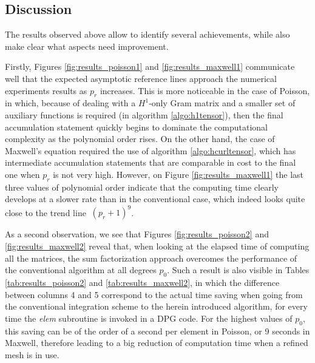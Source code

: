 \subsection{Discussion}

The results observed above allow to identify several achievements, while also make clear what aspects need improvement. 

Firstly, Figures \ref{fig:results_poisson1} and \ref{fig:results_maxwell1} communicate well that the expected asymptotic reference lines approach the numerical experiments results as $p_r$ increases. This is more noticeable in the case of Poisson, in which, because of dealing with a $H^1$-only Gram matrix and a smaller set of auxiliary functions is required (in algorithm \ref{algo:h1tensor}), then the final accumulation statement quickly begins to dominate the computational complexity as the polynomial order rises. On the other hand, the case of Maxwell's equation required the use of algorithm \ref{algo:hcurltensor}, which has intermediate accumulation statements that are comparable in cost to the final one when $p_r$ is not very high. However, on Figure \ref{fig:results_maxwell1} the last three values of polynomial order indicate that the computing time clearly develops at a slower rate than in the conventional case, which indeed looks quite close to the trend line $~(p_r+1)^9$.

As a second observation, we see that Figures \ref{fig:results_poisson2} and \ref{fig:results_maxwell2} reveal that, when looking at the elapsed time of computing all the matrices, the sum factorization approach overcomes the performance of the conventional algorithm at all degrees $p_0$. Such a result is also visible in Tables \ref{tab:results_poisson2} and \ref{tab:results_maxwell2}, in which the difference between columns 4 and 5 correspond to the actual time saving when going from the conventional integration scheme to the herein introduced algorithm, for every time the \textit{elem} subroutine is invoked in a DPG code. For the highest values of $p_0$, this saving can be of the order of a second per element in Poisson, or 9 seconds in Maxwell, therefore leading to a big reduction of computation time when a refined mesh is in use.

